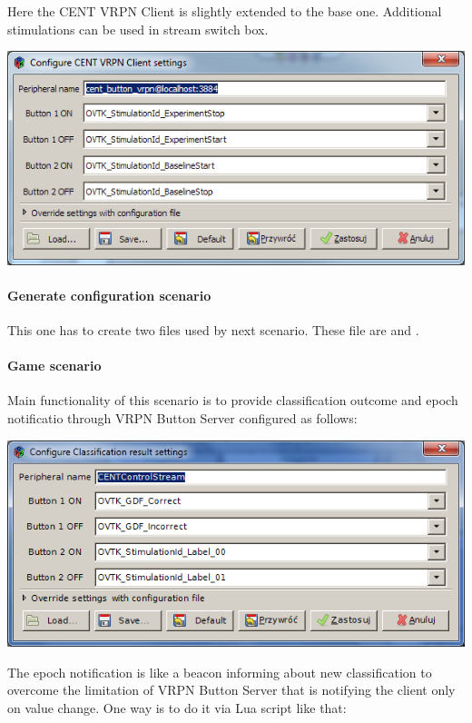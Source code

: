 \documentclass[letterpaper,10pt,english]{sphinxmanual}
\begin{document}
Here the CENT VRPN Client is slightly extended to the base one. Additional stimulations can be used in stream switch box.

\includegraphics{OVBaselineVRPNClientConf.png}


\paragraph{Generate configuration scenario}
\label{index:generate-configuration-scenario}
This one has to create two files used by next scenario. These file are  and .


\paragraph{Game scenario}
\label{index:game-scenario}
Main functionality of this scenario is to provide classification outcome and epoch notificatio through VRPN Button Server configured as follows:

\includegraphics{OVCENTControlStreamConf.png}

The epoch notification is like a beacon informing about new classification to overcome the limitation of VRPN Button Server that is notifying the client only on value change.
One way is to do it via Lua script like that:
\end{document}
